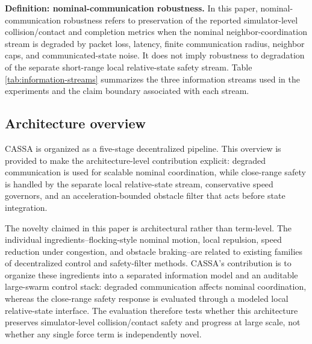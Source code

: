 \documentclass[11pt]{article}
\begin{document}
\textbf{Definition: nominal-communication robustness.} In this paper, nominal-communication robustness refers to preservation of the reported simulator-level collision/contact and completion metrics when the nominal neighbor-coordination stream is degraded by packet loss, latency, finite communication radius, neighbor caps, and communicated-state noise. It does not imply robustness to degradation of the separate short-range local relative-state safety stream. Table \ref{tab:information-streams} summarizes the three information streams used in the experiments and the claim boundary associated with each stream.



\subsection{Architecture overview}

CASSA is organized as a five-stage decentralized pipeline. This overview is provided to make the architecture-level contribution explicit: degraded communication is used for scalable nominal coordination, while close-range safety is handled by the separate local relative-state stream, conservative speed governors, and an acceleration-bounded obstacle filter that acts before state integration.

The novelty claimed in this paper is architectural rather than term-level. The individual ingredients--flocking-style nominal motion, local repulsion, speed reduction under congestion, and obstacle braking--are related to existing families of decentralized control and safety-filter methods. CASSA's contribution is to organize these ingredients into a separated information model and an auditable large-swarm control stack: degraded communication affects nominal coordination, whereas the close-range safety response is evaluated through a modeled local relative-state interface. The evaluation therefore tests whether this architecture preserves simulator-level collision/contact safety and progress at large scale, not whether any single force term is independently novel.
\end{document}

